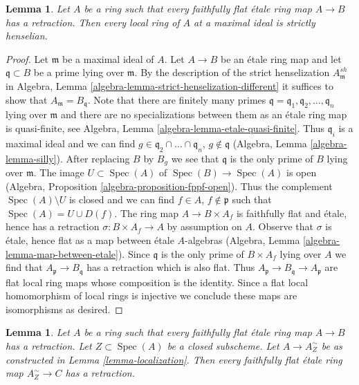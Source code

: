 \documentclass{stacks-project}
\theoremstyle{plain}
\newtheorem{lemma}[subsection]{Lemma}
\theoremstyle{definition}
\theoremstyle{remark}
\numberwithin{equation}{subsection}
\def\Spec{\mathop{\mathrm{Spec}}}
\begin{document}
\begin{lemma}
\label{lemma-have-sections-strictly-henselian}
Let $A$ be a ring such that every faithfully flat \'etale ring map
$A \to B$ has a retraction. Then every local ring of $A$ at a maximal
ideal is strictly henselian.
\end{lemma}

\begin{proof}
Let $\mathfrak m$ be a maximal ideal of $A$. Let $A \to B$ be an
\'etale ring map and let $\mathfrak q \subset B$ be a prime
lying over $\mathfrak m$. By the description of the strict henselization
$A_\mathfrak m^{sh}$ in
Algebra, Lemma \ref{algebra-lemma-strict-henselization-different}
it suffices to show that $A_\mathfrak m = B_\mathfrak q$.
Note that there are finitely many primes
$\mathfrak q = \mathfrak q_1, \mathfrak q_2, \ldots, \mathfrak q_n$
lying over $\mathfrak m$ and there are no specializations
between them as an \'etale ring map is quasi-finite, see
Algebra, Lemma \ref{algebra-lemma-etale-quasi-finite}.
Thus $\mathfrak q_i$ is a maximal ideal and we can find
$g \in \mathfrak q_2 \cap \ldots \cap \mathfrak q_n$, $g \not \in \mathfrak q$
(Algebra, Lemma \ref{algebra-lemma-silly}).
After replacing $B$ by $B_g$ we see that $\mathfrak q$
is the only prime of $B$ lying over $\mathfrak m$.
The image $U \subset \Spec(A)$ of $\Spec(B) \to \Spec(A)$ is
open (Algebra, Proposition \ref{algebra-proposition-fppf-open}).
Thus the complement $\Spec(A) \setminus U$ is closed
and we can find $f \in A$, $f \not \in \mathfrak p$ such that
$\Spec(A) = U \cup D(f)$. The ring map $A \to B \times A_f$
is faithfully flat and \'etale, hence has a retraction
$\sigma : B \times A_f \to A$ by assumption on $A$.
Observe that $\sigma$ is \'etale, hence flat as a map between \'etale
$A$-algebras (Algebra, Lemma \ref{algebra-lemma-map-between-etale}).
Since $\mathfrak q$ is the only prime of $B \times A_f$ lying
over $A$ we find that $A_\mathfrak p \to B_\mathfrak q$ has
a retraction which is also flat. Thus
$A_\mathfrak p \to B_\mathfrak q \to A_\mathfrak p$
are flat local ring maps whose composition is the identity. Since
a flat local homomorphism of local rings is injective we conclude these
maps are isomorphisms as desired.
\end{proof}

\begin{lemma}
\label{lemma-have-sections-localize}
Let $A$ be a ring such that every faithfully flat \'etale ring map
$A \to B$ has a retraction. Let $Z \subset \Spec(A)$ be a closed subscheme.
Let $A \to A_Z^\sim$ be as constructed in Lemma \ref{lemma-localization}.
Then every faithfully flat \'etale ring map $A_Z^\sim \to C$ has
a retraction.
\end{lemma}
\end{document}
